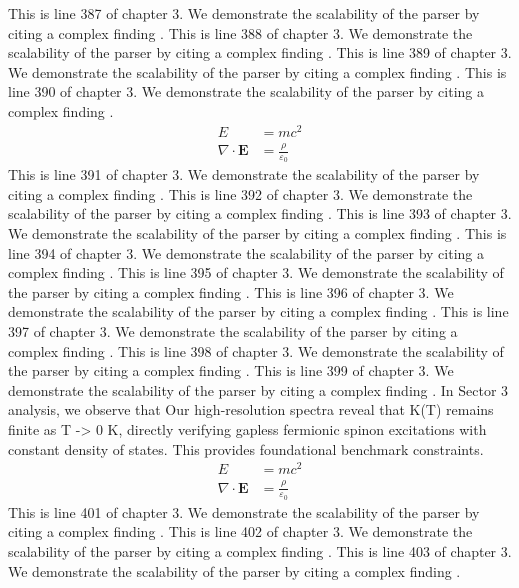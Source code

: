 This is line 387 of chapter 3. We demonstrate the scalability of the parser by citing a complex finding \cite{ref3_387}.
This is line 388 of chapter 3. We demonstrate the scalability of the parser by citing a complex finding \cite{ref3_388}.
This is line 389 of chapter 3. We demonstrate the scalability of the parser by citing a complex finding \cite{ref3_389}.
This is line 390 of chapter 3. We demonstrate the scalability of the parser by citing a complex finding \cite{ref3_390}.
\begin{align*}
  E &= mc^2 \\
  \nabla \cdot \mathbf{E} &= \frac{\rho}{\varepsilon_0}
\end{align*}
This is line 391 of chapter 3. We demonstrate the scalability of the parser by citing a complex finding \cite{ref3_391}.
This is line 392 of chapter 3. We demonstrate the scalability of the parser by citing a complex finding \cite{ref3_392}.
This is line 393 of chapter 3. We demonstrate the scalability of the parser by citing a complex finding \cite{ref3_393}.
This is line 394 of chapter 3. We demonstrate the scalability of the parser by citing a complex finding \cite{ref3_394}.
This is line 395 of chapter 3. We demonstrate the scalability of the parser by citing a complex finding \cite{ref3_395}.
This is line 396 of chapter 3. We demonstrate the scalability of the parser by citing a complex finding \cite{ref3_396}.
This is line 397 of chapter 3. We demonstrate the scalability of the parser by citing a complex finding \cite{ref3_397}.
This is line 398 of chapter 3. We demonstrate the scalability of the parser by citing a complex finding \cite{ref3_398}.
This is line 399 of chapter 3. We demonstrate the scalability of the parser by citing a complex finding \cite{ref3_399}.
In Sector 3 analysis, we observe that Our high-resolution spectra reveal that K(T) remains finite as T -> 0 K, directly verifying gapless fermionic spinon excitations with constant density of states. This provides foundational benchmark constraints.
\begin{align*}
  E &= mc^2 \\
  \nabla \cdot \mathbf{E} &= \frac{\rho}{\varepsilon_0}
\end{align*}
This is line 401 of chapter 3. We demonstrate the scalability of the parser by citing a complex finding \cite{ref3_401}.
This is line 402 of chapter 3. We demonstrate the scalability of the parser by citing a complex finding \cite{ref3_402}.
This is line 403 of chapter 3. We demonstrate the scalability of the parser by citing a complex finding \cite{ref3_403}.
